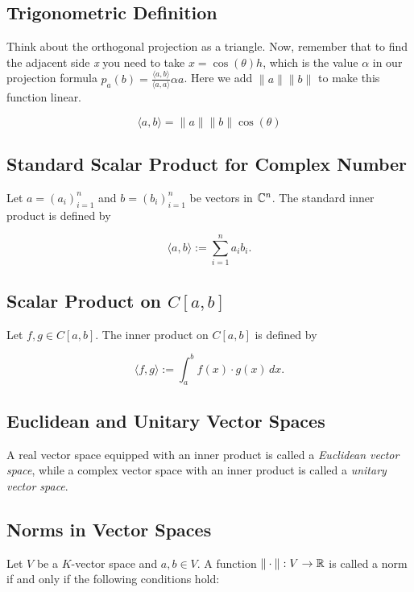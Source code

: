 \subsection{Trigonometric Definition}

Think about the orthogonal projection as a triangle. Now, remember that to find the adjacent side \emph{x} 
you need to take \(x = \cos(\theta)h\), which is the value \(\alpha\) in our projection formula 
\(p_a (b) = \frac{\langle a, b\rangle}{\langle a, a\rangle} \alpha a\). 
Here we add \(\|a\|\|b\|\) to make this function linear.

\[
    \langle a, b \rangle = \|a\| \|b\| \cos (\theta)
\]

\subsection{Standard Scalar Product for Complex Number}

Let \( a = {(a_i)}_{i=1}^n \) and \( b = {(b_i)}_{i=1}^n \) be vectors in \( \mathbb{C}^n \). The standard 
inner product is defined by

\[
    \langle a, b \rangle := \sum_{i=1}^n a_i b_i.
\]

\subsection{Scalar Product on \texorpdfstring{\( C[a, b] \)}{}}

Let \( f, g \in C[a, b] \). The inner product on \( C[a, b] \) is defined by

\[
    \langle f, g \rangle := \int_a^b f(x) \cdot g(x) \, dx.
\]

\subsection{Euclidean and Unitary Vector Spaces}

A real vector space equipped with an inner product is called a \emph{Euclidean vector space}, while a 
complex vector space with an inner product is called a \emph{unitary vector space}.

\subsection{Norms in Vector Spaces}

Let \( V \) be a \( K \)-vector space and \( a, b \in V \). A function \( \| \cdot \| : V \to \mathbb{R} \) 
is called a norm if and only if the following conditions hold:

